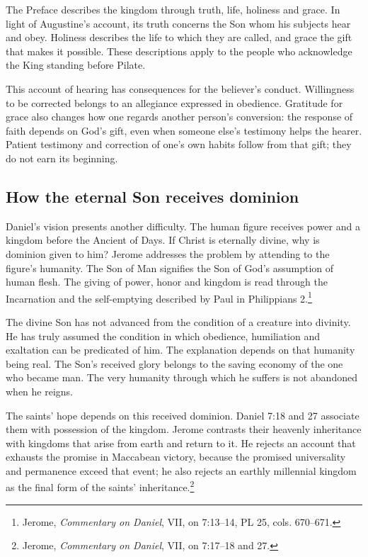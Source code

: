 The Preface describes the kingdom through truth, life, holiness and grace. In light of Augustine's account, its truth concerns the Son whom his subjects hear and obey. Holiness describes the life to which they are called, and grace the gift that makes it possible. These descriptions apply to the people who acknowledge the King standing before Pilate.

This account of hearing has consequences for the believer's conduct. Willingness to be corrected belongs to an allegiance expressed in obedience. Gratitude for grace also changes how one regards another person's conversion: the response of faith depends on God's gift, even when someone else's testimony helps the hearer. Patient testimony and correction of one's own habits follow from that gift; they do not earn its beginning.

\subsection{How the eternal Son receives dominion}
Daniel's vision presents another difficulty. The human figure receives power and a kingdom before the Ancient of Days. If Christ is eternally divine, why is dominion given to him? Jerome addresses the problem by attending to the figure's humanity. The Son of Man signifies the Son of God's assumption of human flesh. The giving of power, honor and kingdom is read through the Incarnation and the self-emptying described by Paul in Philippians 2.\footnote{Jerome, \emph{Commentary on Daniel}, VII, on 7:13--14, PL 25, cols. 670--671.}

The divine Son has not advanced from the condition of a creature into divinity. He has truly assumed the condition in which obedience, humiliation and exaltation can be predicated of him. The explanation depends on that humanity being real. The Son's received glory belongs to the saving economy of the one who became man. The very humanity through which he suffers is not abandoned when he reigns.

The saints' hope depends on this received dominion. Daniel 7:18 and 27 associate them with possession of the kingdom. Jerome contrasts their heavenly inheritance with kingdoms that arise from earth and return to it. He rejects an account that exhausts the promise in Maccabean victory, because the promised universality and permanence exceed that event; he also rejects an earthly millennial kingdom as the final form of the saints' inheritance.\footnote{Jerome, \emph{Commentary on Daniel}, VII, on 7:17--18 and 27.}

